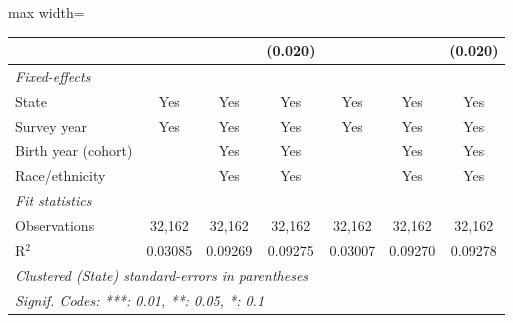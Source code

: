 \begin{adjustbox}{max width=\linewidth}
\begin{tabular}{lcccccc}
                                                         &               &               & (0.020)       &               &               & (0.020)\\   
      \midrule
      \emph{Fixed-effects}\\
      State                                              & Yes           & Yes           & Yes           & Yes           & Yes           & Yes\\  
      Survey year                                        & Yes           & Yes           & Yes           & Yes           & Yes           & Yes\\  
      Birth year (cohort)                                &               & Yes           & Yes           &               & Yes           & Yes\\  
      Race/ethnicity                                     &               & Yes           & Yes           &               & Yes           & Yes\\  
      \midrule
      \emph{Fit statistics}\\
      Observations                                       & 32,162        & 32,162        & 32,162        & 32,162        & 32,162        & 32,162\\  
      R$^2$                                              & 0.03085       & 0.09269       & 0.09275       & 0.03007       & 0.09270       & 0.09278\\  
      \midrule \midrule
      \multicolumn{7}{l}{\emph{Clustered (State) standard-errors in parentheses}}\\
      \multicolumn{7}{l}{\emph{Signif. Codes: ***: 0.01, **: 0.05, *: 0.1}}\\
   \end{tabular}
      \end{adjustbox}
\vspace{3pt}\par{}
